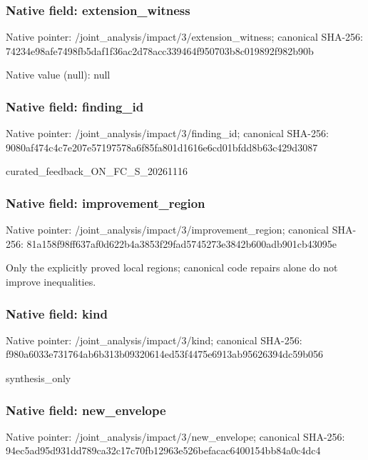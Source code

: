 \documentclass[10pt,a4paper]{article}
\begin{document}
\subsubsection{Native field: extension\_\allowbreak{}witness}
Native pointer: /joint\_\allowbreak{}analysis/impact/3/extension\_\allowbreak{}witness; canonical SHA-256: 74234e98afe7498fb5daf1f36ac2d78acc339464f950703b8c019892f982b90b

Native value (null): null

\subsubsection{Native field: finding\_\allowbreak{}id}
Native pointer: /joint\_\allowbreak{}analysis/impact/3/finding\_\allowbreak{}id; canonical SHA-256: 9080af474c4c7e207e57197578a6f85fa801d1616e6cd01bfdd8b63c429d3087

\begingroup\raggedright\sloppy curated\_\allowbreak{}feedback\_\allowbreak{}ON\_\allowbreak{}FC\_\allowbreak{}S\_\allowbreak{}20261116\par\endgroup

\subsubsection{Native field: improvement\_\allowbreak{}region}
Native pointer: /joint\_\allowbreak{}analysis/impact/3/improvement\_\allowbreak{}region; canonical SHA-256: 81a158f98ff637af0d622b4a3853f29fad5745273e3842b600adb901cb43095e

\begingroup\raggedright\sloppy Only the explicitly proved local regions;\allowbreak{} canonical code repairs alone do not improve inequalities.\par\endgroup

\subsubsection{Native field: kind}
Native pointer: /joint\_\allowbreak{}analysis/impact/3/kind; canonical SHA-256: f980a6033e731764ab6b313b09320614ed53f4475e6913ab95626394dc59b056

\begingroup\raggedright\sloppy synthesis\_\allowbreak{}only\par\endgroup

\subsubsection{Native field: new\_\allowbreak{}envelope}
Native pointer: /joint\_\allowbreak{}analysis/impact/3/new\_\allowbreak{}envelope; canonical SHA-256: 94ec5ad95d931dd789ca32c17c70fb12963e526befacac6400154bb84a0c4dc4
\end{document}
